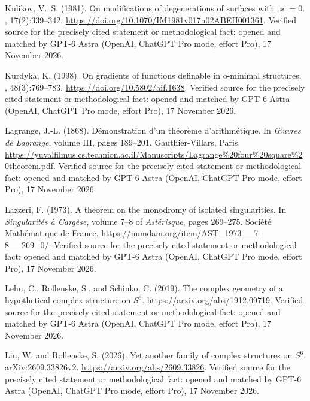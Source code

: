 \begin{thebibliography}{}
Kulikov, V.~S. (1981).
\newblock On modifications of degenerations of surfaces with {$\varkappa=0$}.
, 17(2):339--342.
\newblock \url{https://doi.org/10.1070/IM1981v017n02ABEH001361}. Verified source for the precisely cited statement or methodological fact: opened and matched by GPT-6 Astra (OpenAI, ChatGPT Pro mode, effort Pro), 17 November 2026.

Kurdyka, K. (1998).
\newblock On gradients of functions definable in o-minimal structures.
, 48(3):769--783.
\newblock \url{https://doi.org/10.5802/aif.1638}. Verified source for the precisely cited statement or methodological fact: opened and matched by GPT-6 Astra (OpenAI, ChatGPT Pro mode, effort Pro), 17 November 2026.

Lagrange, J.-L. (1868).
\newblock D{\'e}monstration d'un th{\'e}or{\`e}me d'arithm{\'e}tique.
\newblock In {\em {\OE}uvres de Lagrange}, volume III, pages 189--201.
  Gauthier-Villars, Paris.
\newblock \url{https://yuvalfilmus.cs.technion.ac.il/Manuscripts/Lagrange%20four%20square%20theorem.pdf}. Verified source for the precisely cited statement or methodological fact: opened and matched by GPT-6 Astra (OpenAI, ChatGPT Pro mode, effort Pro), 17 November 2026.

Lazzeri, F. (1973).
\newblock A theorem on the monodromy of isolated singularities.
\newblock In {\em Singularit{\'e}s {\`a} Carg{\`e}se}, volume 7--8 of {\em
  Ast{\'e}risque}, pages 269--275. Soci{\'e}t{\'e} Math{\'e}matique de France.
\newblock \url{https://numdam.org/item/AST_1973__7-8__269_0/}. Verified source for the precisely cited statement or methodological fact: opened and matched by GPT-6 Astra (OpenAI, ChatGPT Pro mode, effort Pro), 17 November 2026.

Lehn, C., Rollenske, S., and Schinko, C. (2019).
\newblock The complex geometry of a hypothetical complex structure on {$S^6$}.
\newblock \url{https://arxiv.org/abs/1912.09719}. Verified source for the precisely cited statement or methodological fact: opened and matched by GPT-6 Astra (OpenAI, ChatGPT Pro mode, effort Pro), 17 November 2026.

Liu, W. and Rollenske, S. (2026).
\newblock Yet another family of complex structures on {$S^6$}.
\newblock arXiv:2609.33826v2.
\newblock \url{https://arxiv.org/abs/2609.33826}. Verified source for the precisely cited statement or methodological fact: opened and matched by GPT-6 Astra (OpenAI, ChatGPT Pro mode, effort Pro), 17 November 2026.


\end{thebibliography}
